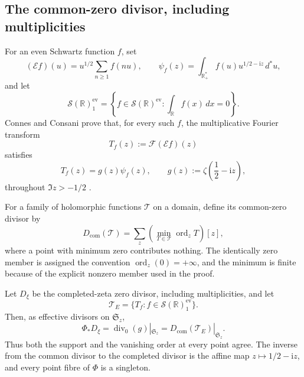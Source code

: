 \subsection{The common-zero divisor, including multiplicities}

For an even Schwartz function \(f\), set
\begin{equation}
\label{eq:spc-E-and-psi}
 (\mathcal Ef)(u)=u^{1/2}\sum_{n\geq1}f(nu),
 \qquad
 \psi_f(z)=\int_{\mathbb R_+^*}f(u)u^{1/2-\mathrm iz}\,d^*u,
\end{equation}
and let
\[
 \mathcal S(\mathbb R)^{\mathrm{ev}}_1
 =
 \left\{f\in\mathcal S(\mathbb R)^{\mathrm{ev}}:
          \int_{\mathbb R}f(x)\,dx=0\right\}.
\]
Connes and Consani prove that, for every such \(f\), the multiplicative
Fourier transform
\[
 T_f(z):=\mathcal F(\mathcal Ef)(z)
\]
satisfies
\begin{equation}
\label{eq:spc-CC-factorization}
 T_f(z)=g(z)\psi_f(z),
 \qquad
 g(z):=\zeta\left(\frac12-\mathrm iz\right),
\end{equation}
throughout \(\Im z>-1/2\)
\cite[Eq.~(2.2) and the continuation immediately following it]{connesConsani2023Hochschild}.

For a family of holomorphic functions \(\mathcal T\) on a domain, define its
common-zero divisor by
\begin{equation}
\label{eq:spc-common-divisor-definition}
 D_{\mathrm{com}}(\mathcal T)
 =
 \sum_z\left(\min_{T\in\mathcal T}\operatorname{ord}_zT\right)[z],
\end{equation}
where a point with minimum zero contributes nothing.  The identically zero
member is assigned the convention \(\operatorname{ord}_z(0)=+\infty\), and
the minimum is finite because of the explicit nonzero member used in the
proof.

\begin{theorem}
\label{thm:spc-common-zero-divisor}
Let \(D_\xi\) be the completed-zeta zero divisor, including multiplicities,
and let
\[
 \mathcal T_E=\{T_f:f\in\mathcal S(\mathbb R)^{\mathrm{ev}}_1\}.
\]
Then, as effective divisors on \(\mathfrak S_z\),
\begin{equation}
\label{eq:spc-three-divisors}
 \Phi_*D_\xi
 =
 \operatorname{div}_0(g)|_{\mathfrak S_z}
 =
 D_{\mathrm{com}}(\mathcal T_E)|_{\mathfrak S_z}.
\end{equation}
Thus both the support and the vanishing order at every point agree.  The
inverse from the common divisor to the completed divisor is the affine map
\(z\mapsto1/2-\mathrm iz\), and every point fibre of \(\Phi\) is a singleton.
\end{theorem}


